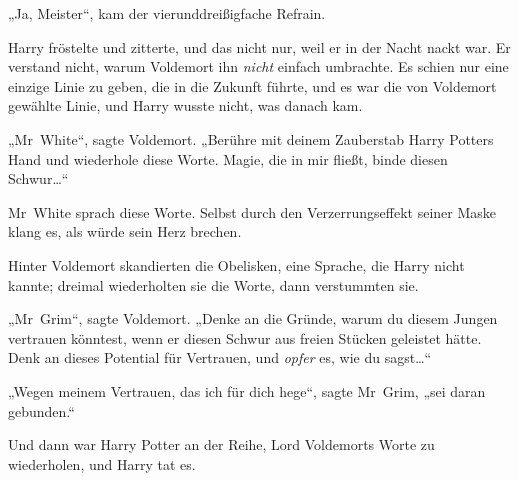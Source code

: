 „Ja, Meister“, kam der vierunddreißigfache Refrain.

Harry fröstelte und zitterte, und das nicht nur, weil er in der Nacht nackt war. Er verstand nicht, warum Voldemort ihn \emph{nicht} einfach umbrachte. Es schien nur eine einzige Linie zu geben, die in die Zukunft führte, und es war die von Voldemort gewählte Linie, und Harry wusste nicht, was danach kam.

„Mr~White“, sagte Voldemort. „Berühre mit deinem Zauberstab Harry Potters Hand und wiederhole diese Worte. Magie, die in mir fließt, binde diesen Schwur…“

Mr~White sprach diese Worte. Selbst durch den Verzerrungseffekt seiner Maske klang es, als würde sein Herz brechen.

Hinter Voldemort skandierten die Obelisken, eine Sprache, die Harry nicht kannte; dreimal wiederholten sie die Worte, dann verstummten sie.

„Mr~Grim“, sagte Voldemort. „Denke an die Gründe, warum du diesem Jungen vertrauen könntest, wenn er diesen Schwur aus freien Stücken geleistet hätte.
Denk an dieses Potential für Vertrauen, und \emph{opfer} es, wie du sagst…“

„Wegen meinem Vertrauen, das ich für dich hege“, sagte Mr~Grim, „sei daran gebunden.“

Und dann war Harry Potter an der Reihe, Lord Voldemorts Worte zu wiederholen, und Harry tat es.

